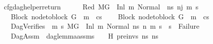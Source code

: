 \begin{isabellebody}
\isamarkupfalse%
\ cfg{\isacharunderscore}{\kern0pt}dag{\isacharunderscore}{\kern0pt}helper{\isacharunderscore}{\kern0pt}return{\isacharunderscore}{\kern0pt}{}{\isacharcolon}{\kern0pt}\isanewline
\ \ \isanewline
\ \ \ Red{\isacharcolon}{\kern0pt}\ {\isachardoublequoteopen}M{\isacharcomma}{\kern0pt}{\isasymLambda}{\isacharcomma}{\kern0pt}{\isasymGamma}{\isacharcomma}{\kern0pt}{\isasymOmega}{\isacharcomma}{\kern0pt}G{}\ {\isasymturnstile}\ {\isacharparenleft}{\kern0pt}Inl\ m{}{\isacharcomma}{\kern0pt}\ {\isacharparenleft}{\kern0pt}Normal\ \ ns{}{\isacharparenright}{\kern0pt}{\isacharparenright}{\kern0pt}\ {\isacharminus}{\kern0pt}n{\isasymrightarrow}{\isacharcircum}{\kern0pt}j\ {\isacharparenleft}{\kern0pt}m{\isacharprime}{\kern0pt}{\isacharcomma}{\kern0pt}\ s{\isacharprime}{\kern0pt}{\isacharparenright}{\kern0pt}{\isachardoublequoteclose}\ \isanewline
\ \ \ Block{\isacharcolon}{\kern0pt}\ {\isachardoublequoteopen}node{\isacharunderscore}{\kern0pt}to{\isacharunderscore}{\kern0pt}block\ G{}\ {\isacharbang}{\kern0pt}\ m{}\ {\isacharequal}{\kern0pt}\ cs{}{\isachardoublequoteclose}\ \isanewline
\ \ \ Block{}{\isacharcolon}{\kern0pt}\ {\isachardoublequoteopen}node{\isacharunderscore}{\kern0pt}to{\isacharunderscore}{\kern0pt}block\ G{}\ {\isacharbang}{\kern0pt}\ m{}\ {\isacharequal}{\kern0pt}\ cs{}{\isachardoublequoteclose}\ \ \isanewline
\ \ \ DagVerifies{\isacharcolon}{\kern0pt}\ {\isachardoublequoteopen}{\isasymAnd}\ m{}{\isacharprime}{\kern0pt}\ s{}{\isacharprime}{\kern0pt}{\isachardot}{\kern0pt}\ {\isacharparenleft}{\kern0pt}M{\isacharcomma}{\kern0pt}{\isasymLambda}{\isacharcomma}{\kern0pt}{\isasymGamma}{\isacharcomma}{\kern0pt}{\isasymOmega}{\isacharcomma}{\kern0pt}G{}\ {\isasymturnstile}\ {\isacharparenleft}{\kern0pt}Inl\ m{}{\isacharcomma}{\kern0pt}\ Normal\ ns{}{\isacharparenright}{\kern0pt}\ {\isacharminus}{\kern0pt}n{\isasymrightarrow}{\isacharasterisk}{\kern0pt}\ {\isacharparenleft}{\kern0pt}m{}{\isacharprime}{\kern0pt}{\isacharcomma}{\kern0pt}\ s{}{\isacharprime}{\kern0pt}{\isacharparenright}{\kern0pt}{\isacharparenright}{\kern0pt}\ {\isasymLongrightarrow}\ s{}{\isacharprime}{\kern0pt}\ {\isasymnoteq}\ Failure{\isachardoublequoteclose}\ \isanewline
\ \ \ DagAssm{\isacharcolon}{\kern0pt}\ \ {\isachardoublequoteopen}dag{\isacharunderscore}{\kern0pt}lemma{\isacharunderscore}{\kern0pt}assms\ {\isasymLambda}\ {\isasymGamma}\ {\isasymOmega}\ H\ pre{\isacharunderscore}{\kern0pt}invs\ ns{}\ ns{}{\isachardoublequoteclose}\ \isanewline

\end{isabellebody}

